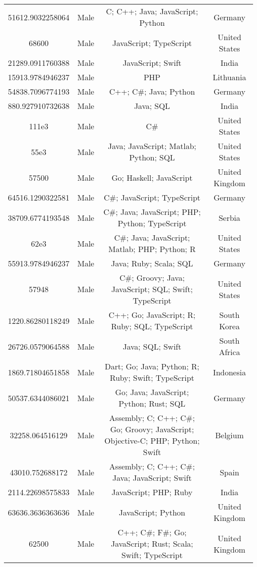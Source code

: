 \begin{center}
\begin{tabular}{ |c|c|c|c| }
51612.9032258064  &  Male  &  C; C++; Java; JavaScript; Python  &  Germany  \\ 
68600  &  Male  &  JavaScript; TypeScript  &  United States  \\ 
21289.0911760388  &  Male  &  JavaScript; Swift  &  India  \\ 
15913.9784946237  &  Male  &  PHP  &  Lithuania  \\ 
54838.7096774193  &  Male  &  C++; C\#; Java; Python  &  Germany  \\ 
880.927910732638  &  Male  &  Java; SQL  &  India  \\ 
111e3  &  Male  &  C\#  &  United States  \\ 
55e3  &  Male  &  Java; JavaScript; Matlab; Python; SQL  &  United States  \\ 
57500  &  Male  &  Go; Haskell; JavaScript  &  United Kingdom  \\ 
64516.1290322581  &  Male  &  C\#; JavaScript; TypeScript  &  Germany  \\ 
38709.6774193548  &  Male  &  C\#; Java; JavaScript; PHP; Python; TypeScript  &  Serbia  \\ 
62e3  &  Male  &  C\#; Java; JavaScript; Matlab; PHP; Python; R  &  United States  \\ 
55913.9784946237  &  Male  &  Java; Ruby; Scala; SQL  &  Germany  \\ 
57948  &  Male  &  C\#; Groovy; Java; JavaScript; SQL; Swift; TypeScript  &  United States  \\ 
1220.86280118249  &  Male  &  C++; Go; JavaScript; R; Ruby; SQL; TypeScript  &  South Korea  \\ 
26726.0579064588  &  Male  &  Java; SQL; Swift  &  South Africa  \\ 
1869.71804651858  &  Male  &  Dart; Go; Java; Python; R; Ruby; Swift; TypeScript  &  Indonesia  \\ 
50537.6344086021  &  Male  &  Go; Java; JavaScript; Python; Rust; SQL  &  Germany  \\ 
32258.064516129  &  Male  &  Assembly; C; C++; C\#; Go; Groovy; JavaScript; Objective-C; PHP; Python; Swift  &  Belgium  \\ 
43010.752688172  &  Male  &  Assembly; C; C++; C\#; Java; JavaScript; Swift  &  Spain  \\ 
2114.22698575833  &  Male  &  JavaScript; PHP; Ruby  &  India  \\ 
63636.3636363636  &  Male  &  JavaScript; Python  &  United Kingdom  \\ 
62500  &  Male  &  C++; C\#; F\#; Go; JavaScript; Rust; Scala; Swift; TypeScript  &  United Kingdom  \\ 

\end{tabular}
\end{center}
